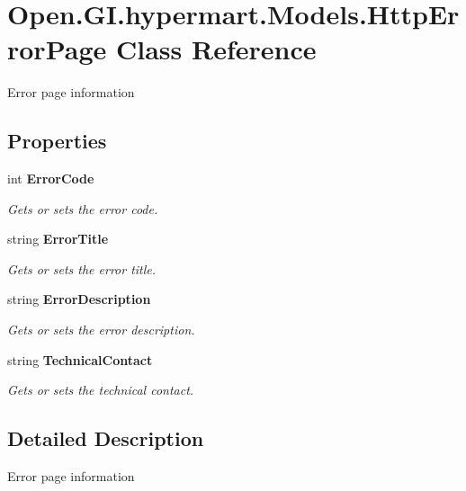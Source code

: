 \section{Open.\+G\+I.\+hypermart.\+Models.\+Http\+Error\+Page Class Reference}
\label{class_open_1_1_g_i_1_1hypermart_1_1_models_1_1_http_error_page}


Error page information  


\subsection*{Properties}
\begin{DoxyCompactItemize}
\item 
int \textbf{ Error\+Code}\hspace{0.3cm}{\ttfamily  [get, set]}
\begin{DoxyCompactList}\small\item\em Gets or sets the error code. \end{DoxyCompactList}\item 
string \textbf{ Error\+Title}\hspace{0.3cm}{\ttfamily  [get, set]}
\begin{DoxyCompactList}\small\item\em Gets or sets the error title. \end{DoxyCompactList}\item 
string \textbf{ Error\+Description}\hspace{0.3cm}{\ttfamily  [get, set]}
\begin{DoxyCompactList}\small\item\em Gets or sets the error description. \end{DoxyCompactList}\item 
string \textbf{ Technical\+Contact}\hspace{0.3cm}{\ttfamily  [get, set]}
\begin{DoxyCompactList}\small\item\em Gets or sets the technical contact. \end{DoxyCompactList}\end{DoxyCompactItemize}


\subsection{Detailed Description}
Error page information 



